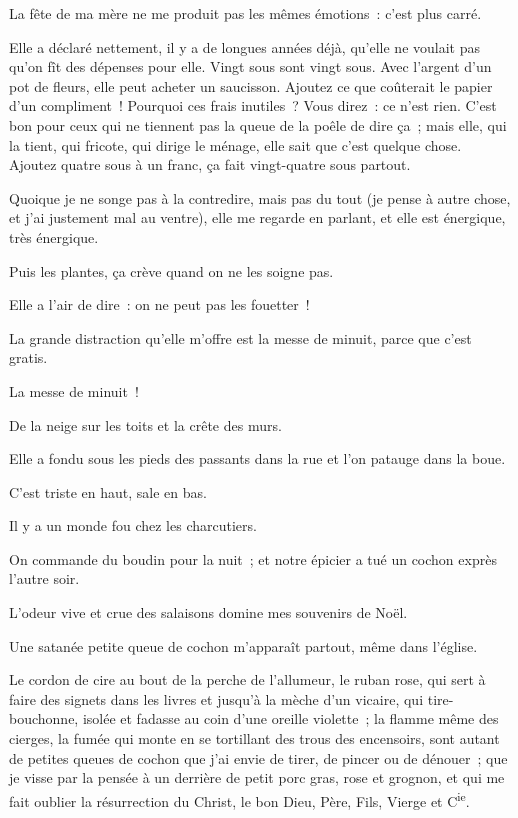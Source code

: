 \documentclass[french,twoside]{book} %
\begin{document}
\bigbreak
\noindent La fête de ma mère ne me produit pas les mêmes émotions : c’est plus carré.\par
Elle a déclaré nettement, il y a de longues années déjà, qu’elle ne voulait pas qu’on fît des dépenses pour elle. Vingt sous sont vingt sous. Avec l’argent d’un pot de fleurs, elle peut acheter un saucisson. Ajoutez ce que coûterait le papier d’un compliment ! Pourquoi ces frais inutiles ? Vous direz : ce n’est rien. C’est bon pour ceux qui ne tiennent pas la queue de la poêle de dire ça ; mais elle, qui la tient, qui fricote, qui dirige le ménage, elle sait que c’est quelque chose. Ajoutez quatre sous à un franc, ça fait vingt-quatre sous partout.\par
Quoique je ne songe pas à la contredire, mais pas du tout (je pense à autre chose, et j’ai justement mal au ventre), elle me regarde en parlant, et elle est énergique, très énergique.\par
Puis les plantes, ça crève quand on ne les soigne pas.\par
Elle a l’air de dire : on ne peut pas les fouetter !\par
\bigbreak
\noindent La grande distraction qu’elle m’offre est la messe de minuit, parce que c’est gratis.\par
La messe de minuit !\par
De la neige sur les toits et la crête des murs.\par
Elle a fondu sous les pieds des passants dans la rue et l’on patauge dans la boue.\par
C’est triste en haut, sale en bas.\par
Il y a un monde fou chez les charcutiers.\par
On commande du boudin pour la nuit ; et notre épicier a tué un cochon exprès l’autre soir.\par
L’odeur vive et crue des salaisons domine mes souvenirs de Noël.\par
Une satanée petite queue de cochon m’apparaît partout, même dans l’église.\par
Le cordon de cire au bout de la perche de l’allumeur, le ruban rose, qui sert à faire des signets dans les livres et jusqu’à la mèche d’un vicaire, qui tire-bouchonne, isolée et fadasse au coin d’une oreille violette ; la flamme même des cierges, la fumée qui monte en se tortillant des trous des encensoirs, sont autant de petites queues de cochon que j’ai envie de tirer, de pincer ou de dénouer ; que je visse par la pensée à un derrière de petit porc gras, rose et grognon, et qui me fait oublier la résurrection du Christ, le bon Dieu, Père, Fils, Vierge et C\textsuperscript{ie}.\par
\end{document}
